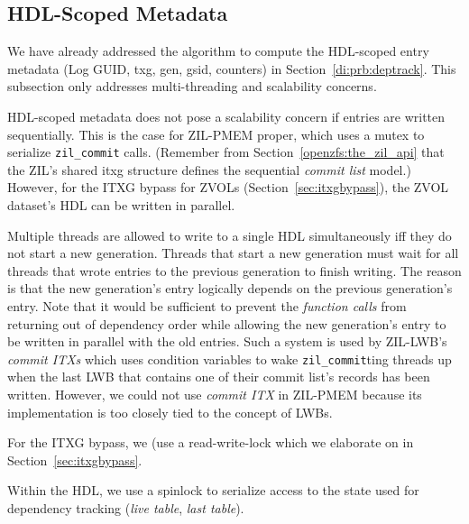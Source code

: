 \documentclass[12pt,a4paper,twoside]{book}
\begin{document}
{\subsection{HDL-Scoped Metadata}\label{di:prb:write:hdlscoped}
We have already addressed the algorithm to compute the HDL-scoped entry metadata (Log GUID, txg, gen, gsid, counters) in Section~\ref{di:prb:deptrack}.
This subsection only addresses multi-threading and scalability concerns.

HDL-scoped metadata does not pose a scalability concern if entries are written sequentially.
This is the case for ZIL-PMEM proper, which uses a mutex to serialize \lstinline{zil_commit} calls.
(Remember from Section~\ref{openzfs:the_zil_api} that the ZIL's shared itxg structure defines the sequential \textit{commit list} model.)
However, for the ITXG bypass for ZVOLs (Section~\ref{sec:itxgbypass}), the ZVOL dataset's HDL can be written in parallel.

Multiple threads are allowed to write to a single HDL simultaneously iff they do not start a new generation.
Threads that start a new generation must wait for all threads that wrote entries to the previous generation to finish writing.
The reason is that the new generation's entry logically depends on the previous generation's entry.
Note that it would be sufficient to prevent the \textit{function calls} from returning out of dependency order while allowing the new generation's entry to be written in parallel with the old entries.
Such a system is used by ZIL-LWB's \textit{commit ITXs} which uses condition variables to wake \lstinline{zil_commit}ting threads up when the last LWB that contains one of their commit list's records has been written.
However, we could not use \textit{commit ITX} in ZIL-PMEM because its implementation is too closely tied to the concept of LWBs.

For the ITXG bypass, we (use a read-write-lock which we elaborate on in Section~\ref{sec:itxgbypass}.

Within the HDL, we use a spinlock to serialize access to the state used for dependency tracking (\textit{live table}, \textit{last table}).

}
\end{document}
